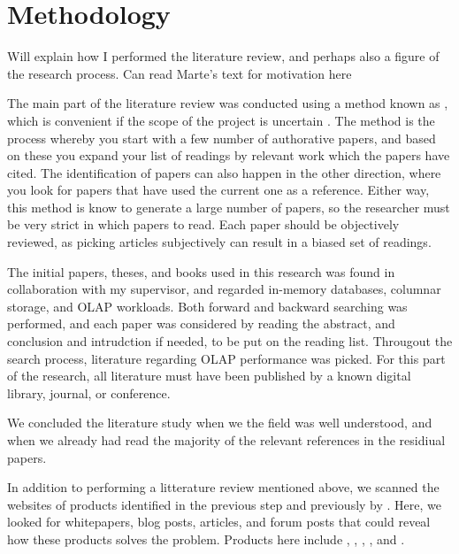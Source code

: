 \section{Methodology}
\label{sec:Methodology}
\begin{secex}
  Will explain how I performed the literature review, and perhaps also a figure of the research process. Can read Marte's text for motivation here
\end{secex}

The main part of the literature review was conducted using a method known as , which is convenient if the scope of the project is uncertain \cite{Ang2014-nm}. The  method is the process whereby you start with a few number of authorative papers, and based on these you expand your list of readings by relevant work which the papers have cited. The identification of papers can also happen in the other direction, where you look for papers that have used the current one as a reference. Either way, this method is know to generate a large number of papers, so the researcher must be very strict in which papers to read. Each paper should be objectively reviewed, as picking articles subjectively can result in a biased set of readings.

The initial papers, theses, and books used in this research was found in collaboration with my supervisor, and regarded in-memory databases, columnar storage, and OLAP workloads. Both forward and backward searching was performed, and each paper was considered by reading the abstract, and conclusion and intrudction if needed, to be put on the reading list. Througout the search process, literature regarding OLAP performance was picked. For this part of the research, all literature must have been published by a known digital library, journal, or conference. 

We concluded the literature study when we the field was well understood, and when we already had read the majority of the relevant references in the residiual papers.

In addition to performing a  litterature review mentioned above, we scanned the websites of products identified in the previous step and previously by \genus. Here, we looked for whitepapers, blog posts, articles, and forum posts that could reveal how these products solves the problem. Products here include , , , , and .
